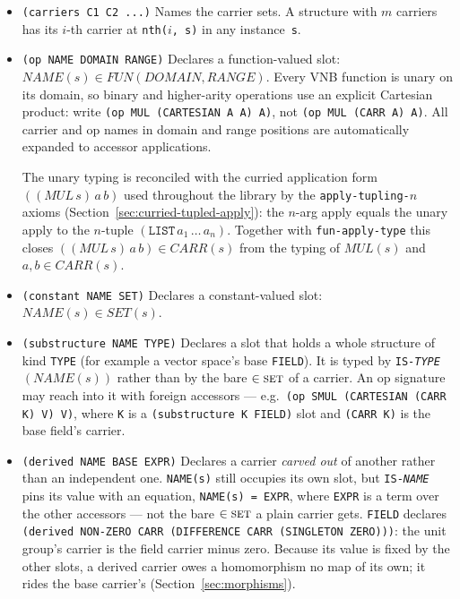 \begin{itemize}

\item \texttt{(carriers C1 C2 ...)}
  Names the carrier sets.  A structure with $m$ carriers has its $i$-th
  carrier at \texttt{nth($i$, s)} in any instance~\texttt{s}.

\item \texttt{(op NAME DOMAIN RANGE)}
  Declares a function-valued slot: $\mathit{NAME}(s) \in
  \mathit{FUN}(\mathit{DOMAIN}, \mathit{RANGE})$.  Every VNB function is
  unary on its domain, so binary and higher-arity operations use an explicit
  Cartesian product: write \texttt{(op MUL (CARTESIAN A A) A)}, not
  \texttt{(op MUL (CARR A) A)}.  All carrier and op names in domain and range
  positions are automatically expanded to accessor applications.

  The unary typing is reconciled with the curried application form
  $((\mathit{MUL}\,s)\,a\,b)$ used throughout the library by the
  \texttt{apply-tupling-$n$} axioms
  (Section~\ref{sec:curried-tupled-apply}): the $n$-arg apply equals the
  unary apply to the $n$-tuple $(\texttt{LIST}\,a_1\,\ldots\,a_n)$.
  Together with \texttt{fun-apply-type} this closes
  $((\mathit{MUL}\,s)\,a\,b) \in CARR(s)$ from the typing of $\mathit{MUL}(s)$
  and $a,b \in CARR(s)$.

\item \texttt{(constant NAME SET)}
  Declares a constant-valued slot: $\mathit{NAME}(s) \in \mathit{SET}(s)$.

\item \texttt{(substructure NAME TYPE)}
  Declares a slot that holds a whole structure of kind \texttt{TYPE}
  (for example a vector space's base \texttt{FIELD}).  It is typed by
  \texttt{IS-\textit{TYPE}}$(\mathit{NAME}(s))$ rather than by the bare
  $\in \textsc{set}$ of a carrier.  An op signature may reach into it
  with foreign accessors --- e.g.\
  \texttt{(op SMUL (CARTESIAN (CARR K) V) V)}, where \texttt{K} is a
  \texttt{(substructure K FIELD)} slot and \texttt{(CARR K)} is the base
  field's carrier.

\item \texttt{(derived NAME BASE EXPR)}
  Declares a carrier \emph{carved out} of another rather than an independent
  one.  \texttt{NAME(s)} still occupies its own slot, but \texttt{IS-\textit{NAME}}
  pins its value with an equation, \texttt{NAME(s) = EXPR}, where \texttt{EXPR}
  is a term over the other accessors --- not the bare $\in\textsc{set}$ a plain
  carrier gets.  \texttt{FIELD} declares
  \texttt{(derived NON-ZERO CARR (DIFFERENCE CARR (SINGLETON ZERO)))}: the unit
  group's carrier is the field carrier minus zero.  Because its value is fixed
  by the other slots, a derived carrier owes a homomorphism no map of its own;
  it rides the base carrier's (Section~\ref{sec:morphisms}).


\end{itemize}
